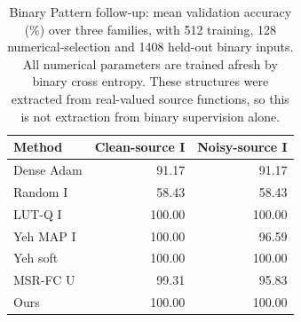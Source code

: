 \begin{table}[htbp]\centering\small
\begin{tabular}{lrr}\toprule
Method & Clean-source I & Noisy-source I\\\midrule
Dense Adam & 91.17 & 91.17\\
Random I & 58.43 & 58.43\\
LUT-Q I & 100.00 & 100.00\\
Yeh MAP I & 100.00 & 96.59\\
Yeh soft & 100.00 & 100.00\\
MSR-FC U & 99.31 & 95.83\\
Ours & 100.00 & 100.00\\
\bottomrule\end{tabular}
\caption{Binary Pattern follow-up: mean validation accuracy (\%) over three families, with 512 training, 128 numerical-selection and 1408 held-out binary inputs. All numerical parameters are trained afresh by binary cross entropy. These structures were extracted from real-valued source functions, so this is not extraction from binary supervision alone.}
\label{tab:benchmark-binary}\end{table}
